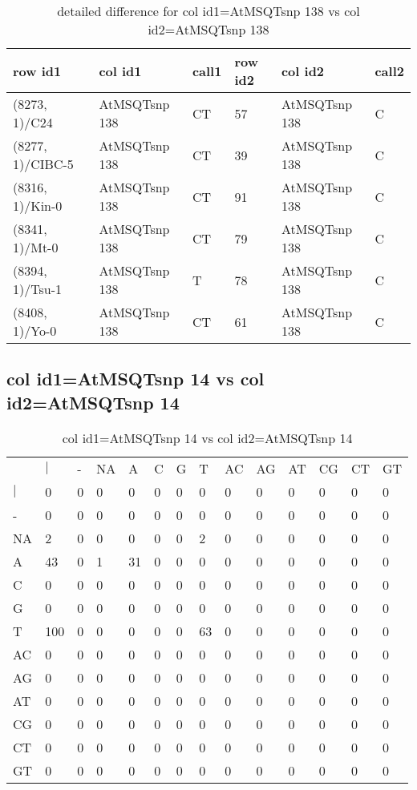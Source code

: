 \begin{center}
\begin{longtable}{|l|l|l|l|l|l|}
\caption{detailed difference for col id1=AtMSQTsnp 138 vs col id2=AtMSQTsnp 138} \label{table_dm517}\\
\hline
row id1&col id1&call1&row id2&col id2&call2\\
\hline
(8273, 1)/C24&AtMSQTsnp 138&CT&57&AtMSQTsnp 138&C\\
(8277, 1)/CIBC-5&AtMSQTsnp 138&CT&39&AtMSQTsnp 138&C\\
(8316, 1)/Kin-0&AtMSQTsnp 138&CT&91&AtMSQTsnp 138&C\\
(8341, 1)/Mt-0&AtMSQTsnp 138&CT&79&AtMSQTsnp 138&C\\
(8394, 1)/Tsu-1&AtMSQTsnp 138&T&78&AtMSQTsnp 138&C\\
(8408, 1)/Yo-0&AtMSQTsnp 138&CT&61&AtMSQTsnp 138&C\\
\hline
\end{longtable}
\end{center}

\subsection{col id1=AtMSQTsnp 14 vs col id2=AtMSQTsnp 14}
\begin{center}
\begin{longtable}{|l|l|l|l|l|l|l|l|l|l|l|l|l|l|}
\caption{col id1=AtMSQTsnp 14 vs col id2=AtMSQTsnp 14} \label{table_dm518}\\
\hline
\\
\hline
&$|$&-&NA&A&C&G&T&AC&AG&AT&CG&CT&GT\\
$|$&0&0&0&0&0&0&0&0&0&0&0&0&0\\
-&0&0&0&0&0&0&0&0&0&0&0&0&0\\
NA&2&0&0&0&0&0&2&0&0&0&0&0&0\\
A&43&0&1&31&0&0&0&0&0&0&0&0&0\\
C&0&0&0&0&0&0&0&0&0&0&0&0&0\\
G&0&0&0&0&0&0&0&0&0&0&0&0&0\\
T&100&0&0&0&0&0&63&0&0&0&0&0&0\\
AC&0&0&0&0&0&0&0&0&0&0&0&0&0\\
AG&0&0&0&0&0&0&0&0&0&0&0&0&0\\
AT&0&0&0&0&0&0&0&0&0&0&0&0&0\\
CG&0&0&0&0&0&0&0&0&0&0&0&0&0\\
CT&0&0&0&0&0&0&0&0&0&0&0&0&0\\
GT&0&0&0&0&0&0&0&0&0&0&0&0&0\\
\hline
\end{longtable}
\end{center}

